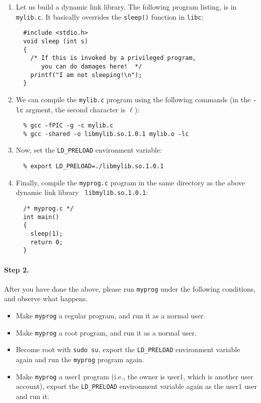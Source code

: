   \begin{enumerate}
  \item Let us build a dynamic link library. The following program listing,
  is in {\tt mylib.c}. It basically overrides the {\tt sleep()} function 
  in {\tt libc}:
  \begin{verbatim}
  #include <stdio.h>
  void sleep (int s)
  {
    /* If this is invoked by a privileged program, 
       you can do damages here!  */
    printf("I am not sleeping!\n");
  }
  \end{verbatim}

  \item We can compile the {\tt mylib.c} program using the following commands (in the 
  {\tt -lc} argment, the second character is $\ell$):
  \begin{verbatim}
  % gcc -fPIC -g -c mylib.c
  % gcc -shared -o libmylib.so.1.0.1 mylib.o -lc
  \end{verbatim}

  

  \item Now, set the {\tt LD\_PRELOAD} environment variable:  
  \begin{verbatim}
  % export LD_PRELOAD=./libmylib.so.1.0.1  
  \end{verbatim}

  \item Finally, compile the {\tt myprog.c} program
  in the same directory as the above dynamic link library {\tt
  libmylib.so.1.0.1}:
  \begin{verbatim}
  /* myprog.c */
  int main()
  {
    sleep(1);
    return 0;
  }
  \end{verbatim}
  \end{enumerate}


\paragraph{Step 2.} 
After you have done the above, please run {\tt myprog} under the following
conditions, and observe what happens. 

  \begin{itemize}
  \item Make {\tt myprog} a regular program, and run it as a normal user.
  \item Make {\tt myprog} a \setuid root program, and run it as a normal user.
  \item Become root with {\tt sudo su}, export the {\tt LD\_PRELOAD}
  environment variable again and run the {\tt myprog} program again.

  \item Make {\tt myprog} a \setuid user1 program (i.e., the owner is user1, which 
        is another user account), export the {\tt LD\_PRELOAD} environment variable 
	again as the user1 user and run it.
  \end{itemize}


